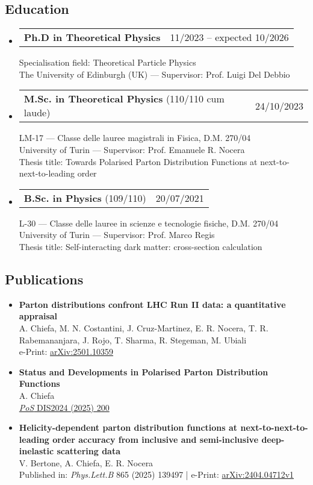 \documentclass[10pt,a4paper]{article}
\makeatletter
\newcommand{\headerrow}[2]
{\begin{tabular*}{\linewidth}{l@{\extracolsep{\fill}}r}
	#1 &
	#2 \\
\end{tabular*}}
\makeatother
\begin{document}
\subsection*{Education}
\begin{itemize}[leftmargin=1em]
  \item[] 
  \headerrow
		{\textbf{Ph.D in Theoretical Physics}}
    {11/2023 – expected 10/2026}
    Specialisation field: Theoretical Particle Physics\\
    The University of Edinburgh (UK) — Supervisor: Prof. Luigi Del Debbio
  \item[]
  \headerrow
    {\textbf{M.Sc. in Theoretical Physics} (110/110 cum laude)}
    {24/10/2023}
    LM-17 — Classe delle lauree magistrali in Fisica, D.M. 270/04\\
    University of Turin — Supervisor: Prof. Emanuele R. Nocera\\
    Thesis title: Towards Polarised Parton Distribution Functions at next-to-next-to-leading order
  \item[]
  \headerrow
    {\textbf{B.Sc. in Physics} (109/110)}
    {20/07/2021}
    L-30 — Classe delle lauree in scienze e tecnologie fisiche, D.M. 270/04\\
    University of Turin — Supervisor: Prof. Marco Regis\\
    Thesis title: Self-interacting dark matter: cross-section calculation
\end{itemize}

\subsection*{Publications}
\begin{itemize}[leftmargin=1em]
    \item[] 
      \textbf{Parton distributions confront LHC Run II data: a quantitative appraisal} \\
      A. Chiefa, M. N. Costantini, J. Cruz-Martinez, E. R. Nocera, T. R. Rabemananjara, J. Rojo, T. Sharma, R. Stegeman, M. Ubiali \\
      e-Print: \href{https://arxiv.org/abs/2501.10359}{arXiv:2501.10359}
    \item[] 
      \textbf{Status and Developments in Polarised Parton Distribution Functions} \\
      A. Chiefa\\
      \href{https://pos.sissa.it/469/200/pdf}{\textit{PoS} DIS2024 (2025) 200}
    \item[]
      \textbf{Helicity-dependent parton distribution functions at next-to-next-to-leading order accuracy from inclusive and semi-inclusive deep-inelastic scattering data} \\
      V. Bertone, A. Chiefa, E. R. Nocera \\
      Published in: {\it Phys.Lett.B} 865 (2025) 139497 | e-Print: \href{https://arxiv.org/pdf/2404.04712}{arXiv:2404.04712v1}
\end{itemize}
\end{document}
